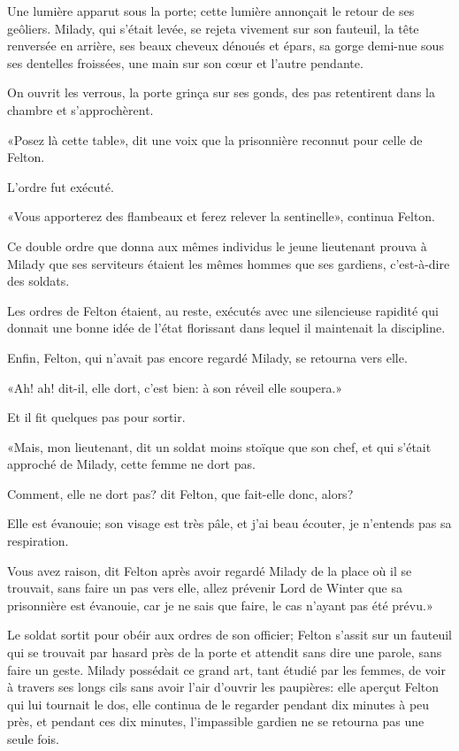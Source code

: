 Une lumière apparut sous la porte; cette lumière annonçait le retour de ses geôliers. Milady, qui s'était levée, se rejeta vivement sur son fauteuil, la tête renversée en arrière, ses beaux cheveux dénoués et épars, sa gorge demi-nue sous ses dentelles froissées, une main sur son cœur et l'autre pendante. 

On ouvrit les verrous, la porte grinça sur ses gonds, des pas retentirent dans la chambre et s'approchèrent. 

«Posez là cette table», dit une voix que la prisonnière reconnut pour celle de Felton. 

L'ordre fut exécuté. 

«Vous apporterez des flambeaux et ferez relever la sentinelle», continua Felton. 

Ce double ordre que donna aux mêmes individus le jeune lieutenant prouva à Milady que ses serviteurs étaient les mêmes hommes que ses gardiens, c'est-à-dire des soldats. 

Les ordres de Felton étaient, au reste, exécutés avec une silencieuse rapidité qui donnait une bonne idée de l'état florissant dans lequel il maintenait la discipline. 

Enfin, Felton, qui n'avait pas encore regardé Milady, se retourna vers elle. 

«Ah! ah! dit-il, elle dort, c'est bien: à son réveil elle soupera.» 

Et il fit quelques pas pour sortir. 

«Mais, mon lieutenant, dit un soldat moins stoïque que son chef, et qui s'était approché de Milady, cette femme ne dort pas. 

\speak  Comment, elle ne dort pas? dit Felton, que fait-elle donc, alors? 

\speak  Elle est évanouie; son visage est très pâle, et j'ai beau écouter, je n'entends pas sa respiration. 

\speak  Vous avez raison, dit Felton après avoir regardé Milady de la place où il se trouvait, sans faire un pas vers elle, allez prévenir Lord de Winter que sa prisonnière est évanouie, car je ne sais que faire, le cas n'ayant pas été prévu.» 

Le soldat sortit pour obéir aux ordres de son officier; Felton s'assit sur un fauteuil qui se trouvait par hasard près de la porte et attendit sans dire une parole, sans faire un geste. Milady possédait ce grand art, tant étudié par les femmes, de voir à travers ses longs cils sans avoir l'air d'ouvrir les paupières: elle aperçut Felton qui lui tournait le dos, elle continua de le regarder pendant dix minutes à peu près, et pendant ces dix minutes, l'impassible gardien ne se retourna pas une seule fois. 

